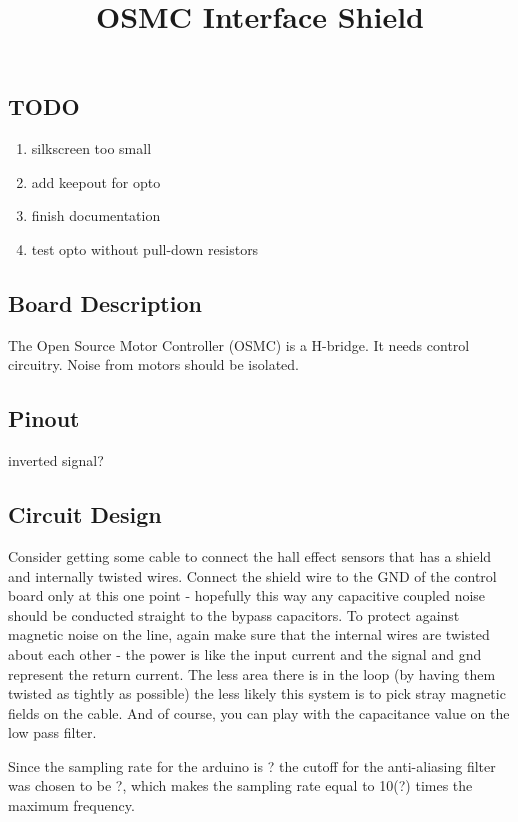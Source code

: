\documentclass[letterpaper,12pt,notitlepage]{report}
\begin{document}
\title{OSMC Interface Shield}
\author{}
\date{}
\maketitle

\subsection{TODO}
\begin{enumerate}
 \item silkscreen too small
 \item add keepout for opto
 \item finish documentation
 \item test opto without pull-down resistors
\end{enumerate}

\subsection{Board Description}
The Open Source Motor Controller (OSMC) is a H-bridge.  It needs control circuitry.  Noise from motors should be isolated.


\subsection{Pinout}

inverted signal?

\subsection{Circuit Design}

Consider getting some cable to connect the hall effect sensors that has a shield and internally twisted wires. Connect the shield wire to the GND of the control board only at this one point - hopefully this way any capacitive coupled noise should be conducted straight to the bypass capacitors. To protect against magnetic noise on the line, again make sure that the internal wires are twisted about each other - the power is like the input current and the signal and gnd represent the return current. The less area there is in the loop (by having them twisted as tightly as possible) the less likely this system is to pick stray magnetic fields on the cable. And of course, you can play with the capacitance value on the low pass filter. 

Since the sampling rate for the arduino is ? the cutoff for the anti-aliasing filter was chosen to be ?, which makes the sampling rate equal to 10(?) times the maximum frequency.
\end{document}
